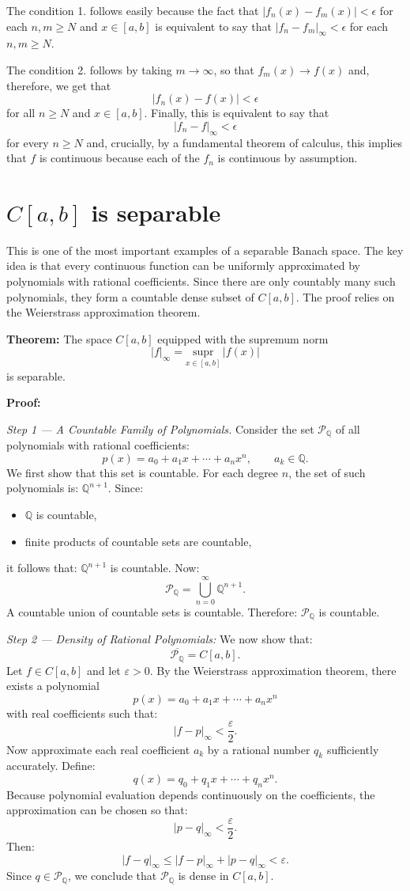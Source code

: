 \documentclass[aps,prl,twocolumn,groupedaddress]{revtex4-2}
\newcommand{\supr}[2]{\underset{#1}{\text{supr}}}
\begin{document}
The condition 1. follows easily because the fact that $|f_n(x)-f_m(x)|<\epsilon$ for each $n,m\geq N$ and $x\in [a,b]$ is equivalent to say that $|f_n-f_m|_\infty<\epsilon$ for each $n,m\geq N$.

The condition 2. follows by taking $m\to \infty$, so that $f_m(x)\to f(x)$ and, therefore, we get that
$$
|f_n(x)-f(x)|<\epsilon
$$
for all $n\geq N$ and $x\in [a,b]$.
Finally, this is equivalent to say that
$$
|f_n-f|_{\infty} < \epsilon
$$
for every $n\geq N$ and, crucially, by a fundamental theorem of calculus, this implies that $f$ is continuous because each of the $f_n$ is continuous by assumption.

\section{
$C[a,b]$ is separable
\label{app:B}
}

This is one of the most important examples of a separable Banach space.
The key idea is that every continuous function can be uniformly approximated by polynomials with rational coefficients.
Since there are only countably many such polynomials, they form a countable dense subset of $C[a,b]$.
The proof relies on the Weierstrass approximation theorem.

{\bf Theorem:}
The space
$
C[a,b]
$
equipped with the supremum norm
$$
|f|_\infty
=
\supr{x\in[a,b]}\,\,|f(x)|
$$
is separable.

{\bf Proof:}

{\em Step 1 — A Countable Family of Polynomials.}
Consider the set
$
\mathcal P_{\mathbb Q}
$
of all polynomials with rational coefficients:
$$
p(x)=a_0+a_1x+\cdots+a_nx^n,
\qquad
a_k\in\mathbb Q.
$$
We first show that this set is countable.
For each degree $n$, the set of such polynomials is:
$
\mathbb Q^{n+1}.
$
Since:
\begin{itemize}
\item $\mathbb Q$ is countable,
\item finite products of countable sets are countable,
\end{itemize}
it follows that:
$
\mathbb Q^{n+1}
$
is countable.
Now:
$$
\mathcal P_{\mathbb Q}
=
\bigcup_{n=0}^\infty \mathbb Q^{n+1}.
$$
A countable union of countable sets is countable.
Therefore:
$
\mathcal P_{\mathbb Q}
$
is countable.

{\em Step 2 — Density of Rational Polynomials:}
We now show that:
$$
\overline{\mathcal P_{\mathbb Q}}
=
C[a,b].
$$
Let
$
f\in C[a,b]
$
and let
$
\varepsilon>0.
$
By the Weierstrass approximation theorem, there exists a polynomial
$$
p(x)=a_0+a_1x+\cdots+a_nx^n
$$
with real coefficients such that:
$$
|f-p|_\infty<\frac{\varepsilon}{2}.
$$
Now approximate each real coefficient $a_k$ by a rational number $q_k$ sufficiently accurately.
Define:
$$
q(x)=q_0+q_1x+\cdots+q_nx^n.
$$
Because polynomial evaluation depends continuously on the coefficients, the approximation can be chosen so that:
$$
|p-q|_\infty<\frac{\varepsilon}{2}.
$$
Then:
$$
|f-q|_\infty
\le
|f-p|_\infty+|p-q|_\infty
<
\varepsilon.
$$
Since $q\in\mathcal P_{\mathbb Q}$, we conclude that
$
\mathcal P_{\mathbb Q}
$
is dense in $C[a,b]$.
\end{document}
